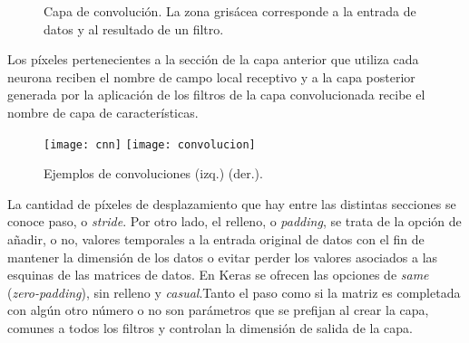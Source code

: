 \begin{itemize}
\begin{figure}

\caption{Capa de convolución. La zona grisácea corresponde a la entrada de datos y al resultado de un filtro. }
\label{fig:convolution}
\end{figure}

Los píxeles pertenecientes a la sección de la capa anterior que utiliza cada neurona reciben el nombre de campo local receptivo y a la capa posterior generada por la aplicación de los filtros de la capa convolucionada recibe el nombre de capa de características.\\

\begin{figure}[htpb]
  \centering
  \texttt{[image: cnn]}
  \vrule
  \texttt{[image: convolucion]}
  \caption{Ejemplos de convoluciones \cite{stanford}(izq.) \cite{whatConvolucion}(der.). }
  \label{fig:convolucion}
\end{figure}
La cantidad de píxeles de desplazamiento que hay entre las distintas secciones se conoce paso, o \emph{stride}. Por otro lado, el relleno, o \emph{padding}, se trata de la opción de añadir, o no, valores temporales a la entrada original de datos con el fin de mantener la dimensión de los datos o evitar perder los valores asociados a las esquinas de las matrices de datos. En Keras \cite{chollet2015keras} se ofrecen las opciones de \emph{same} (\emph{zero-padding}), sin relleno y \emph{casual}.Tanto el paso como si la matriz es completada con algún otro número o no son parámetros que se prefijan al crear la capa, comunes a todos los filtros y controlan la dimensión de salida de la capa.\\


\end{itemize}
